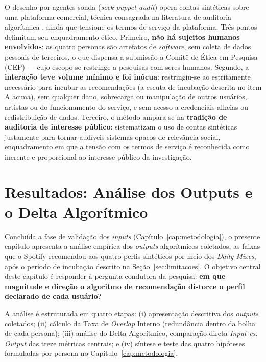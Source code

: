 \documentclass[12pt, %
openright,
oneside, %
a4paper,    %
english,   %
brazil]{facom-ufu-abntex2}
\begin{document}
O desenho por agentes-sonda (\emph{sock puppet audit}) opera contas sintéticas
sobre uma plataforma comercial, técnica consagrada na literatura de auditoria
algorítmica \cite{sandvig2014auditing}, ainda que tensione os termos de serviço da
plataforma. Três pontos delimitam seu enquadramento ético. Primeiro, \textbf{não
há sujeitos humanos envolvidos}: as quatro personas são artefatos de
\emph{software}, sem coleta de dados pessoais de terceiros, o que dispensa a
submissão a Comitê de Ética em Pesquisa (CEP) --- cujo escopo se restringe a
pesquisas com seres humanos. Segundo, a \textbf{interação teve volume mínimo e foi
inócua}: restringiu-se ao estritamente necessário para incubar as recomendações
(a escuta de incubação descrita no item A acima), sem qualquer dano, sobrecarga ou
manipulação de outros usuários, artistas ou do funcionamento do serviço, e sem
acesso a credenciais alheias ou redistribuição de dados. Terceiro, o método
ampara-se na \textbf{tradição de auditoria de interesse público}:
 sistematizam o uso de contas sintéticas
justamente para tornar audíveis sistemas opacos de relevância social,
enquadramento em que a tensão com os termos de serviço é reconhecida como inerente
e proporcional ao interesse público da investigação.

\chapter{Resultados: Análise dos Outputs e o Delta Algorítmico}
\label{cap:resultados}

Concluída a fase de validação dos \emph{inputs}
(Capítulo~\ref{cap:metodologia}), o presente capítulo apresenta a análise
empírica dos \emph{outputs} algorítmicos coletados, as faixas que o Spotify
recomendou aos quatro perfis sintéticos por meio dos \emph{Daily Mixes}, após o
período de incubação descrito na Seção~\ref{sec:limitacoes}. O objetivo central
deste capítulo é responder à pergunta condutora da pesquisa: \textbf{em que
magnitude e direção o algoritmo de recomendação distorce o perfil declarado de
cada usuário?}

A análise é estruturada em quatro etapas: (i) apresentação descritiva dos
\emph{outputs} coletados; (ii) cálculo da Taxa de \emph{Overlap} Interno
(redundância dentro da bolha de cada persona); (iii) análise do Delta Algorítmico,
comparação direta \emph{Input vs. Output} das treze métricas centrais; e (iv)
síntese e teste das quatro hipóteses formuladas por persona no
Capítulo~\ref{cap:metodologia}.
\end{document}
